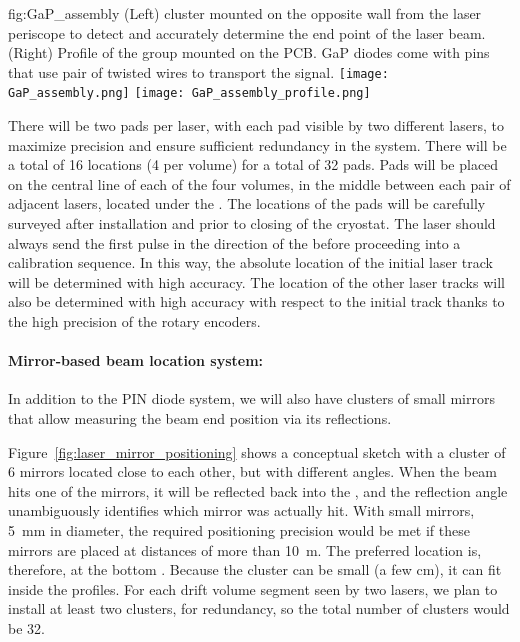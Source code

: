 \begin{dunefigure}{fig:GaP_assembly}
{(Left)  cluster mounted on the opposite wall from the laser periscope to detect and accurately determine the end point of the laser beam. (Right)
Profile of the  group mounted on the PCB. GaP diodes come with pins that use pair of twisted wires to transport the signal.}
\texttt{[image: GaP\_assembly.png]} 
\texttt{[image: GaP\_assembly\_profile.png]} 
\end{dunefigure}


There will be two  pads per laser, with each pad visible by two different lasers, to maximize precision and ensure sufficient redundancy in the system. There will be a total of 16 locations (4 per volume) for a total of 32 pads. Pads will be placed on the central line of each of the four volumes, in the middle between each pair of adjacent lasers, located under the . The locations of the pads will be carefully surveyed after installation and prior to closing of the cryostat. The laser should always send the first pulse in the direction of the  before proceeding into a calibration sequence. In this way, the absolute location of the initial laser track will be determined with high accuracy. The location of the other laser tracks will also be determined with high accuracy with respect to the initial track thanks to the high precision of the rotary encoders.

\paragraph{Mirror-based beam location system:}

In addition to the PIN diode system, we will also have clusters of small mirrors that allow measuring the beam end position via its reflections.

Figure~\ref{fig:laser_mirror_positioning} shows a conceptual sketch with a cluster of \num{6} mirrors located close to each other, but with different angles. When the beam hits one of the mirrors, it will be reflected back into the , and the reflection angle unambiguously identifies which mirror was actually hit. With small mirrors, \SI{5}{\milli\m} in diameter, the required positioning precision would be met if these mirrors are placed at distances of more than \SI{10}{\m}. The preferred location is, therefore, at the bottom . Because the cluster can be small (a few cm), it can fit inside the  profiles. For each drift volume segment seen by two lasers, we plan to install at least two clusters, for redundancy, so the total number of clusters would be \num{32}. 

